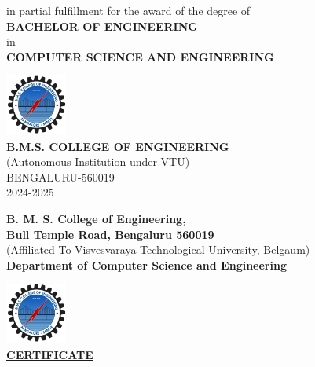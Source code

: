 \begin{titlepage}
    {\large in partial fulfillment for the award of the degree of} \\
    \vspace{0.5cm}
    {\large \textbf{BACHELOR OF ENGINEERING}} \\
    \vspace{0.125cm}
    {\large in} \\
    \vspace{0.25cm}
    {\large \textbf{COMPUTER SCIENCE AND ENGINEERING}} \\
    
    \vspace{1cm}
    
    \includegraphics[width=0.15\textwidth]{bmsce.png} \\
    \vspace{0.5cm}
    {\large \textbf{B.M.S. COLLEGE OF ENGINEERING}} \\[0.5em]
    {\large (Autonomous Institution under VTU)} \\[0.5em]
    { BENGALURU-560019} \\[0.5em]
    { 2024-2025} \\
    

\end{titlepage}

\clearpage


    \begin{center}
    
    {\large \textbf{B. M. S. College of Engineering,}}\\[0.25em]
    {\large \textbf{Bull Temple Road, Bengaluru 560019}}\\[0.25em]
    
    (Affiliated To Visvesvaraya Technological University, Belgaum)\\[0.25em]
    \textbf{Department of Computer Science and Engineering}
        

    \vspace{0.75cm}
    \includegraphics[width=0.15\textwidth]{bmsce.png}\\
    \vspace{0.75cm}
    \textbf{\Large \underline{CERTIFICATE}}\\
    \vspace{0.5cm}
    \end{center}

